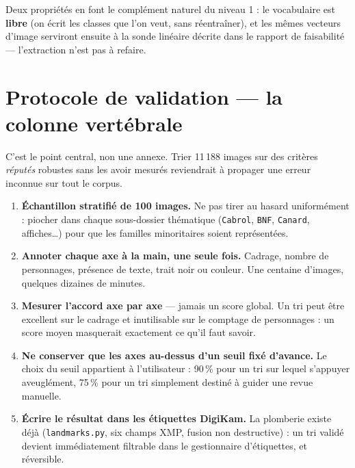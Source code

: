 \documentclass[11pt,a4paper]{article}
\begin{document}
Deux propriétés en font le complément naturel du niveau 1 : le vocabulaire est
\textbf{libre} (on écrit les classes que l'on veut, sans réentraîner), et les
mêmes vecteurs d'image serviront ensuite à la sonde linéaire décrite dans le
rapport de faisabilité — l'extraction n'est pas à refaire.

\section{Protocole de validation --- la colonne vertébrale}
\label{sec:validation}

C'est le point central, non une annexe. Trier 11\,188 images sur des critères
\emph{réputés} robustes sans les avoir mesurés reviendrait à propager une erreur
inconnue sur tout le corpus.

\begin{enumerate}[leftmargin=*,itemsep=5pt]
  \item \textbf{Échantillon stratifié de 100 images.} Ne pas tirer au hasard
  uniformément : piocher dans chaque sous-dossier thématique
  (\texttt{Cabrol}, \texttt{BNF}, \texttt{Canard}, affiches\dots) pour que les
  familles minoritaires soient représentées.

  \item \textbf{Annoter chaque axe à la main, une seule fois.} Cadrage, nombre de
  personnages, présence de texte, trait noir ou couleur. Une centaine d'images,
  quelques dizaines de minutes.

  \item \textbf{Mesurer l'accord axe par axe} — jamais un score global. Un tri
  peut être excellent sur le cadrage et inutilisable sur le comptage de
  personnages : un score moyen masquerait exactement ce qu'il faut savoir.

  \item \textbf{Ne conserver que les axes au-dessus d'un seuil fixé d'avance.}
  Le choix du seuil appartient à l'utilisateur : 90\,\% pour un tri sur lequel
  s'appuyer aveuglément, 75\,\% pour un tri simplement destiné à guider une revue
  manuelle.

  \item \textbf{Écrire le résultat dans les étiquettes DigiKam.} La plomberie
  existe déjà (\texttt{landmarks.py}, six champs XMP, fusion non destructive) :
  un tri validé devient immédiatement filtrable dans le gestionnaire
  d'étiquettes, et réversible.
\end{enumerate}
\end{document}
